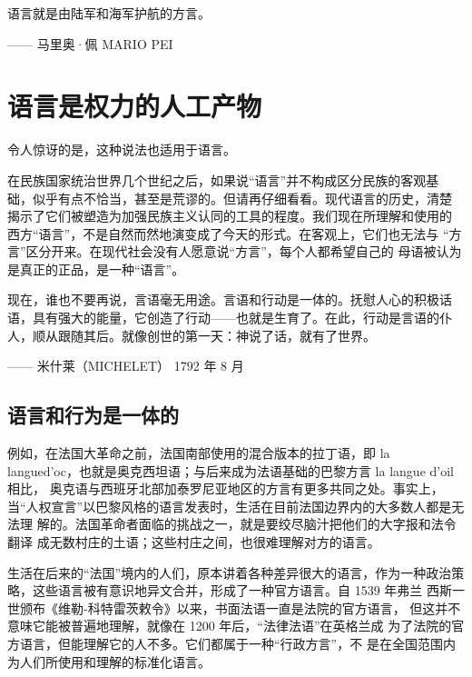 \begin{tcolorbox}
\kaishu 语言就是由陆军和海军护航的方言。  
\begin{flushright}
—— 马里奥·佩 MARIO PEI 
\end{flushright}
\end{tcolorbox}


\section{语言是权力的人工产物}

令人惊讶的是，这种说法也适用于语言。

在民族国家统治世界几个世纪之后，如果说“语言”并不构成区分民族的客观基 础，似乎有点不恰当，甚至是荒谬的。但请再仔细看看。现代语言的历史，清楚 揭示了它们被塑造为加强民族主义认同的工具的程度。我们现在所理解和使用的 西方“语言”，不是自然而然地演变成了今天的形式。在客观上，它们也无法与 “方言”区分开来。在现代社会没有人愿意说“方言”，每个人都希望自己的 母语被认为是真正的正品，是一种“语言”。


\begin{tcolorbox}
\kaishu 现在，谁也不要再说，言语毫无用途。言语和行动是一体的。抚慰人心的积极话语，具有强大的能量，它创造了行动——也就是生育了。在此，行动是言语的仆人，顺从跟随其后。就像创世的第一天：神说了话，就有了世界。
\begin{flushright}
—— 米什莱（MICHELET） 1792 年 8 月
\end{flushright}
\end{tcolorbox}

\subsection{语言和行为是一体的}

例如，在法国大革命之前，法国南部使用的混合版本的拉丁语，即 la langued'oc，也就是奥克西坦语；与后来成为法语基础的巴黎方言 la langue d'oil 相比， 奥克语与西班牙北部加泰罗尼亚地区的方言有更多共同之处。事实上，当“人权宣言”以巴黎风格的语言发表时，生活在目前法国边界内的大多数人都是无法理 解的。法国革命者面临的挑战之一，就是要绞尽脑汁把他们的大字报和法令翻译 成无数村庄的土语；这些村庄之间，也很难理解对方的语言。

生活在后来的“法国”境内的人们，原本讲着各种差异很大的语言，作为一种政治策略，这些语言被有意识地异文合并，形成了一种官方语言。自 1539 年弗兰 西斯一世颁布《维勒-科特雷茨敕令》以来，书面法语一直是法院的官方语言， 但这并不意味它能被普遍地理解，就像在 1200 年后，“法律法语”在英格兰成 为了法院的官方语言，但能理解它的人不多。它们都属于一种“行政方言”，不 是在全国范围内为人们所使用和理解的标准化语言。


